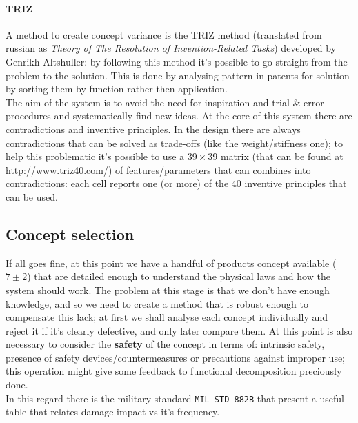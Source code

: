 		\paragraph{TRIZ} A method to create concept variance is the TRIZ method (translated from russian as \textit{Theory of The Resolution of Invention-Related Tasks}) developed by Genrikh Altshuller: by following this method it's possible to go straight from the problem to the solution. This is done by analysing pattern in patents for solution by sorting them by function rather then application.	\\
		The aim of the system is to avoid the need for inspiration and trial \& error procedures and systematically find new ideas. At the core of this system there are contradictions and inventive principles. In the design there are always contradictions that can be solved as trade-offs (like the weight/stiffness one); to help this problematic it's possible to use a $39\times 39$ matrix (that can be found at \url{http://www.triz40.com/}) of features/parameters that can combines into contradictions: each cell reports one (or more) of the 40 inventive principles that can be used.
		
	\subsection{Concept selection}
		If all goes fine, at this point we have a handful of products concept available ($7\pm 2$) that are detailed enough to understand the physical laws and how the system should work. The problem at this stage is that we don't have enough knowledge, and so we need to create a method that is robust enough to compensate this lack; at first we shall analyse each concept individually and reject it if it's clearly defective, and only later compare them. At this point is also necessary to consider the \textbf{safety} of the concept in terms of: intrinsic safety, presence of safety devices/countermeasures or precautions against improper use; this operation might give some feedback to functional decomposition preciously done.\\
		In this regard there is the military standard \texttt{MIL-STD 882B} that present a useful table that relates damage impact vs it's frequency.
		
